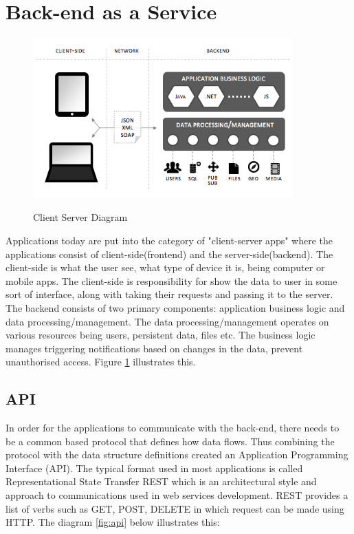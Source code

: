 \section{Back-end as a Service}

\begin{figure}[!h]
    \caption{Client Server Diagram}
    \centering
    \includegraphics[width=100mm]{images/client-server-diagram}
    \label{fig:client-server}
\end{figure}

Applications today are put into the category of "client-server apps" where the applications consist of client-side(frontend) and the server-side(backend). The client-side is what the user see, what type of device it is, being computer or mobile apps. The client-side is responsibility for show the data to user in some sort of interface, along with taking their requests and passing it to the server. 
The backend consists of two primary components: application business logic and data processing/management. The data processing/management operates on various resources being users, persistent data, files etc. The business logic manages triggering notifications based on changes in the data, prevent unauthorised access.  Figure \ref{fig:client-server} illustrates this.

\subsection{API}

In order for the applications to communicate with the back-end, there needs to be a common based protocol that defines how data flows. Thus combining the protocol with the data structure definitions created an Application Programming Interface (API). The typical format used in most applications is called  Representational State Transfer REST which is an architectural style and approach to communications used in web services development. REST provides a list of verbs such as GET, POST, DELETE in which request can be made using HTTP. The diagram \ref{fig:api} below illustrates this: 

